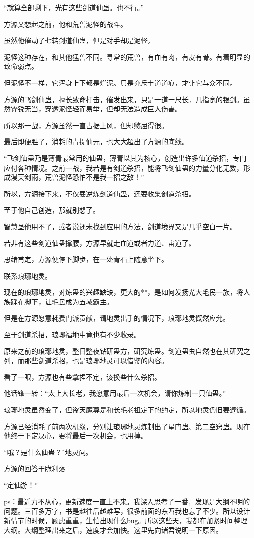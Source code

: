 \begin{this_body}
“就算全部剩下，光有这些剑道仙蛊。也不行。”

方源又想起之前，他和荒兽泥怪的战斗。

虽然他催动了七转剑道仙蛊，但是对手却是泥怪。

泥怪这种存在，和其他猛兽不同。寻常的荒兽，有血有肉，有皮有骨。有着明显的致命弱点。

但泥怪不一样，它浑身上下都是烂泥。只是充斥土道道痕，才让它与众不同。

方源的飞剑仙蛊，擅长致命打击，催发出来，只是一道一尺长，几指宽的银剑。虽然锋锐无当，穿透泥怪轻而易举，但却无法造成巨大伤害。

所以那一战，方源虽然一直占据上风，但却憋屈得很。

最后即便胜了，消耗的青提仙元，也大大超出了方源的底线。

“飞剑仙蛊乃是薄青最常用的仙蛊，薄青以其为核心，创造出许多仙道杀招，专门应付各种情况。之前一战，我若是有剑道杀招，能将飞剑仙蛊的力量分化无数，形成漫天剑雨，荒兽泥怪恐怕不是我一招之敌！”

所以，方源接下来，不仅要逆炼剑道仙蛊，还要收集剑道杀招。

至于他自己创造，那就别想了。

智慧蛊他用不了，或者说还未找到应用的方法，剑道境界又是几乎空白一片。

若非有这些剑道仙蛊撑腰，方源早就走血道或者力道、宙道了。

思绪甫定，方源便停下脚步，在一处青石上随意坐下。

联系琅琊地灵。

现在的琅琊地灵，对炼蛊的兴趣缺缺，更大的**，是如何发扬光大毛民一族，将人族踩在脚下，让毛民成为五域霸主。

但是在方源愿意耗费门派贡献，请地灵出手的情况下，琅琊地灵慨然应允。

至于剑道杀招，琅琊福地中竟也有不少收录。

原来之前的琅琊地灵，整日整夜钻研蛊方，研究炼蛊。剑道蛊虫自然也在其研究之列，而那些剑道杀招，也是琅琊地灵可以借鉴的内容。

看了一眼，方源也有些拿捏不定，该换些什么杀招。

他话锋一转：“太上大长老，我愿意用最后一次机会，请你炼制一只仙蛊。”

琅琊地灵虽然变了，但盗天魔尊是和长毛老祖定下的约定，所以地灵仍旧要遵循。

方源已经消耗了前两次机缘，分别让琅琊地灵炼制出了星门蛊、第二空窍蛊。现在他终于下定决心，要将最后一次机会，也用掉。

“哦？是什么仙蛊？”地灵问。

方源的回答干脆利落

“定仙游！”

ps：最近力不从心，更新速度一直上不来。我深入思考了一番，发现是大纲不明的问题。三百多万字，书是越往后越难写，很多前面的东西我也忘了不少。所以设计新情节的时候，顾虑重重，生怕出现什么bug。所以这些天，我都在加紧时间整理大纲。大纲整理出来之后，速度才会加快。这里先向诸君说明一下原因。

\end{this_body}

